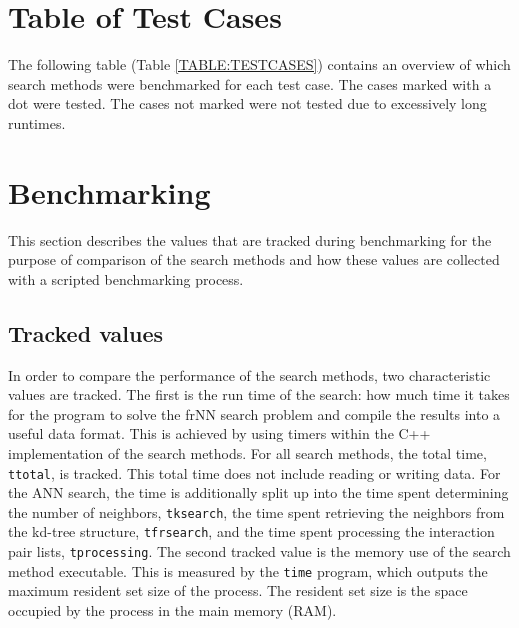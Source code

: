 \section{Table of Test Cases}

The following table (Table \ref{TABLE:TESTCASES}) contains an overview of which search methods were benchmarked for each test case. The cases marked with a dot were tested. The cases not marked were not tested due to excessively long runtimes.

\begin{table}[htbp]
	\centering
	\renewcommand{\arraystretch}{1.3} %
	
	\label{TABLE:TESTCASES}
\end{table}


\section{Benchmarking}
\label{SECTION:BENCHMARKING}

This section describes the values that are tracked during benchmarking for the purpose of comparison of the search methods and how these values are collected with a scripted benchmarking process.

\subsection{Tracked values}

In order to compare the performance of the search methods, two characteristic values are tracked. The first is the run time of the search: how much time it takes for the program to solve the frNN search problem and compile the results into a useful data format. This is achieved by using timers within the C++ implementation of the search methods. For all search methods, the total time, \texttt{ttotal}, is tracked. This total time does not include reading or writing data. For the ANN search, the time is additionally split up into the time spent determining the number of neighbors, \texttt{tksearch}, the time spent retrieving the neighbors from the kd-tree structure, \texttt{tfrsearch}, and the time spent processing the interaction pair lists, \texttt{tprocessing}. The second tracked value is the memory use of the search method executable. This is measured by the \texttt{time} program, which outputs the maximum resident set size of the process. The resident set size is the space occupied by the process in the main memory (RAM).

